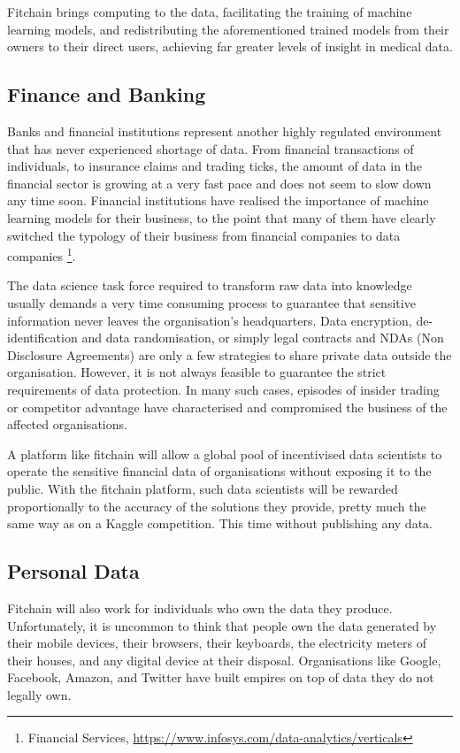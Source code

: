 \documentclass[12pt, a4paper,titlepage]{extreport}
\begin{document}
Fitchain brings computing to the data, facilitating the training of machine learning models, and redistributing the aforementioned trained models from their owners to their direct users, achieving far greater levels of insight in medical data.


\subsection{Finance and Banking}
Banks and financial institutions represent another highly regulated environment that has never experienced shortage of data. From financial transactions of individuals, to insurance claims and trading ticks, the amount of data in the financial sector is growing at a very fast pace and does not seem to slow down any time soon. 
Financial institutions have realised the importance of machine learning models for their business, to the point that many of them have clearly switched the typology of their business from financial companies to data companies \footnote{Financial Services,  \url{https://www.infosys.com/data-analytics/verticals}}. 

The data science task force required to transform raw data into knowledge usually demands a very time consuming process to guarantee that sensitive information never leaves the organisation's headquarters. Data encryption, de-identification and data randomisation, or simply legal contracts and NDAs (Non Disclosure Agreements) are only a few strategies to share private data outside the organisation. However, it is not always feasible to guarantee the strict requirements of data protection. In many such cases, episodes of insider trading or competitor advantage have characterised and compromised the business of the affected organisations.

A platform like fitchain will allow a global pool of incentivised data scientists to operate the sensitive financial data of organisations without exposing it to the public. With the fitchain platform, such data scientists will be rewarded proportionally to the accuracy of the solutions they provide, pretty much the same way as on a Kaggle \cite{kaggle} competition. This time without publishing any data.


\subsection{Personal Data}
Fitchain will also work for individuals who own the data they produce. Unfortunately, it is uncommon to think that people own the data generated by their mobile devices, their browsers, their keyboards, the electricity meters of their houses, and any digital device at their disposal. 
Organisations like Google, Facebook, Amazon, and Twitter have built empires on top of data they do not legally own.
\end{document}

